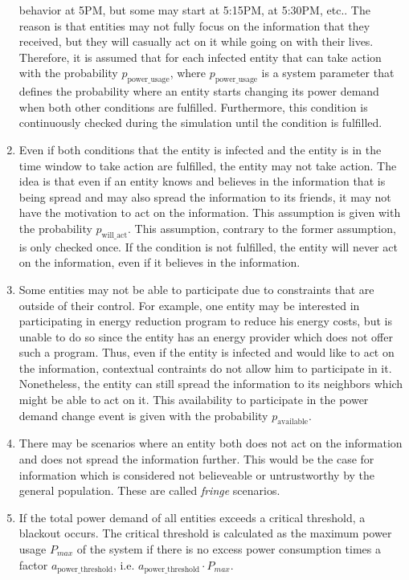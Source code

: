 \begin{enumerate}
    behavior at 5PM, but some may start at 5:15PM, at 5:30PM, etc..
    The reason is that entities may not fully focus on the information
    that they received, but they will casually act on it while going 
    on with their lives. 
    Therefore, it is assumed that for each infected entity that can 
    take action with the probability $p_{\mathrm{power\_usage}}$, where 
    $p_{\mathrm{power\_usage}}$ is a system
    parameter that defines the probability where an entity
    starts changing its power demand when both other conditions are
    fulfilled. Furthermore, this condition is continuously checked 
    during the simulation until the condition is fulfilled.
    \item Even if both conditions that
    the entity is infected and the entity is in the time window 
    to take action are fulfilled, the entity may not take action.
    The idea is that even if an entity knows and believes
    in the information that is being spread and may also spread
    the information to its friends, it may not have the motivation 
    to act on the information.
    This assumption is given with the probability $p_{\mathrm{will\_act}}$.
    This assumption, contrary to the former assumption, is only
    checked once. If the condition is not fulfilled, the 
    entity will never act on the information, even if 
    it believes in the information.
    \item Some entities may not be able to participate due 
    to constraints that are outside of their control. For example, 
    one entity may be interested in participating in energy reduction
    program to reduce his energy costs, but is unable to do so since 
    the entity has an energy provider which does not offer such a program.
    Thus, even if the entity is infected and would like to act on the 
    information, contextual contraints do not allow him to participate in it.
    Nonetheless, the entity can still spread the information to its neighbors
    which might be able to act on it. 
    This availability to participate in the power demand change event is 
    given with the probability $p_{\mathrm{available}}$.
    \item There may be scenarios where 
    an entity both does not act on the information and does not 
    spread the information further. This would be the case for information
    which is considered not believeable or untrustworthy by the general
    population. These are called \textit{fringe} scenarios.
    \item If the total power demand of all entities exceeds a 
    critical threshold, a blackout occurs. The critical threshold
    is calculated as the maximum power usage $P_{max}$ 
    of the system if there is no excess power consumption times 
    a factor $a_{\mathrm{power\_threshold}}$, i.e.
    $a_{\mathrm{power\_threshold}} \cdot P_{max}$.
\end{enumerate}


